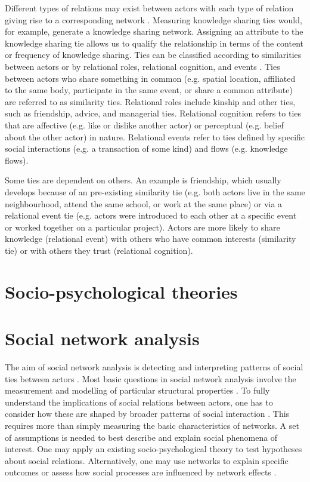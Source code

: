 Different types of relations may exist between actors with each type of relation giving rise to a corresponding network \citep{borgatti2013analyzing}. Measuring knowledge sharing ties would, for example, generate a knowledge sharing network. Assigning an attribute to the knowledge sharing tie allows us to qualify the relationship in terms of the content or frequency of knowledge sharing. Ties can be classified according to similarities between actors or by relational roles, relational cognition, and events \citep{borgatti2013analyzing}. Ties between actors who share something in common (e.g. spatial location, affiliated to the same body, participate in the same event, or share a common attribute) are referred to as similarity ties. Relational roles include kinship and other ties, such as friendship, advice, and managerial ties. Relational cognition refers to ties that are affective (e.g. like or dislike another actor) or perceptual (e.g. belief about the other actor) in nature. Relational events refer to ties defined by specific social interactions (e.g. a transaction of some kind) and flows (e.g. knowledge flows).\medskip

Some ties are dependent on others. An example is friendship, which usually develops because of an pre-existing similarity tie (e.g. both actors live in the same neighbourhood, attend the same school, or work at the same place) or via a relational event tie (e.g. actors were introduced to each other at a specific event or worked together on a particular project). Actors are more likely to share  knowledge (relational event) with others who have common interests (similarity tie) or with others they trust (relational cognition). \medskip 

\section{Socio-psychological theories}






\section{Social network analysis}

The aim of social network analysis is detecting and interpreting patterns of social ties between actors \citep{de2011exploratory}. Most basic questions in social network analysis involve the measurement and modelling of particular structural properties \citep{butts2008social}. To fully understand the implications of social relations between actors, one has to consider how these are shaped by broader patterns of social interaction \citep{scott2011sage}. This requires more than simply measuring the basic characteristics of networks. A set of assumptions is needed to best describe and explain social phenomena of interest.  One may apply an existing socio-psychological theory to test hypotheses about social relations. Alternatively, one may use networks to explain specific outcomes or assess how social processes are influenced by network effects \citep{scott2011sage,borgatti2013analyzing}. \medskip\medskip



